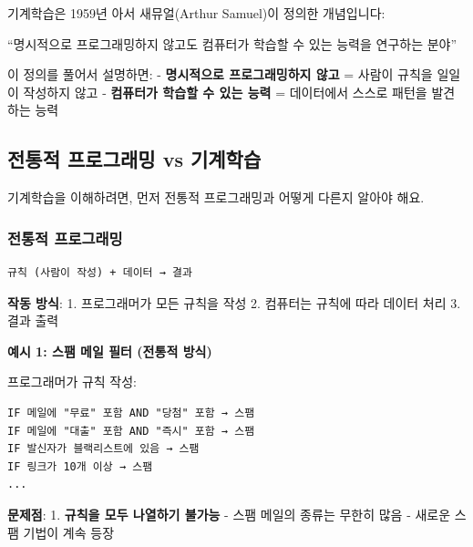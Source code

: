 \documentclass[a4paper, 11pt]{article}
\renewenvironment{quote}
  {\begin{tcolorbox}[colback=lightblue!30, colframe=mainblue!50,
   left=8pt, right=8pt, top=4pt, bottom=4pt, breakable]}
  {\end{tcolorbox}}
\begin{document}
기계학습은 1959년 아서 새뮤얼(Arthur Samuel)이 정의한 개념입니다:

\begin{quote}
``명시적으로 프로그래밍하지 않고도 컴퓨터가 학습할 수 있는 능력을
연구하는 분야''
\end{quote}

이 정의를 풀어서 설명하면: - \textbf{명시적으로 프로그래밍하지 않고} =
사람이 규칙을 일일이 작성하지 않고 - \textbf{컴퓨터가 학습할 수 있는
능력} = 데이터에서 스스로 패턴을 발견하는 능력

\hypertarget{uxc804uxd1b5uxc801-uxd504uxb85cuxadf8uxb798uxbc0d-vs-uxae30uxacc4uxd559uxc2b5}{%
\subsection{전통적 프로그래밍 vs
기계학습}\label{uxc804uxd1b5uxc801-uxd504uxb85cuxadf8uxb798uxbc0d-vs-uxae30uxacc4uxd559uxc2b5}}

기계학습을 이해하려면, 먼저 전통적 프로그래밍과 어떻게 다른지 알아야
해요.

\hypertarget{uxc804uxd1b5uxc801-uxd504uxb85cuxadf8uxb798uxbc0d}{%
\subsubsection{전통적
프로그래밍}\label{uxc804uxd1b5uxc801-uxd504uxb85cuxadf8uxb798uxbc0d}}

\begin{verbatim}
규칙 (사람이 작성) + 데이터 → 결과
\end{verbatim}

\textbf{작동 방식}: 1. 프로그래머가 모든 규칙을 작성 2. 컴퓨터는 규칙에
따라 데이터 처리 3. 결과 출력

\textbf{예시 1: 스팸 메일 필터 (전통적 방식)}

프로그래머가 규칙 작성:

\begin{verbatim}
IF 메일에 "무료" 포함 AND "당첨" 포함 → 스팸
IF 메일에 "대출" 포함 AND "즉시" 포함 → 스팸
IF 발신자가 블랙리스트에 있음 → 스팸
IF 링크가 10개 이상 → 스팸
...
\end{verbatim}

\textbf{문제점}: 1. \textbf{규칙을 모두 나열하기 불가능} - 스팸 메일의
종류는 무한히 많음 - 새로운 스팸 기법이 계속 등장
\end{document}
